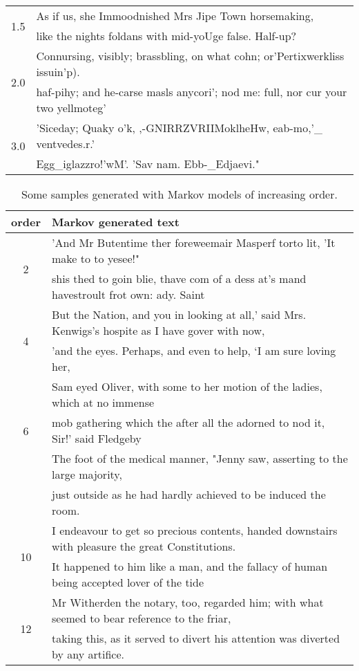 \documentclass[journal]{IEEEtran}
\begin{document}
\begin{table*}
\begin{center}
\begin{tabular}{|c|l|}
  \hline
  \multirow{2}{*}{1.5} & As if us, she Immoodnished Mrs Jipe Town horsemaking,\\
  & like the nights foldans with mid-yoUge false. Half-up?\\
  \hline
  \multirow{2}{*}{2.0} & Connursing, visibly; brassbling, on what cohn;
or’Pertixwerkliss issuin'p).\\
  & haf-pihy; and he-carse masls anycori’; nod me: full, nor cur your two
yellmoteg'\\
  \hline
  \multirow{2}{*}{3.0} & 'Siceday; Quaky o’k, ,-GNIRRZVRIIMoklheHw, eab-mo,'\_ ventvedes.r.'\\
  & Egg\_iglazzro!’wM’. 'Sav nam. Ebb-\_Edjaevi." \\
  \hline
  \end{tabular}
  \end{center}
\end{table*}

\begin{table*}
  \begin{center}
    \caption{Some samples generated with Markov models of increasing
order.\label{tab:text_markov}}
  \begin{tabular}{|c|l|}
  \hline
  order & Markov generated text \\
  \hline
  \multirow{2}{*}{2} & 'And Mr Butentime ther foreweemair Masperf torto lit, 'It
make to to yesee!" \\
  & shis thed to goin blie, thave com of a dess at's mand havestroult frot own:
ady. Saint\\
  \hline
  \multirow{2}{*}{4} & But the Nation, and you in looking at all,' said Mrs.
Kenwigs's hospite as I have gover with now,\\
  & 'and the eyes. Perhaps, and even to help, ‘I am sure loving her,\\
  \hline
  \multirow{3}{*}{6} & Sam eyed Oliver, with some to her motion of the ladies,
which at no immense\\
  & mob gathering which the after all the adorned to nod it, Sir!' said
Fledgeby\\
  \hline
  \multirow{2}{*}{8} & The foot of the medical manner, "Jenny saw, asserting to
the large majority,\\
  &just outside as he had hardly achieved to be induced the room.\\
  \hline
  \multirow{2}{*}{10} & I endeavour to get so precious contents, handed
downstairs with pleasure the great Constitutions. \\
  & It happened to him like a man,  and the fallacy of human being accepted
lover of the tide\\
  \hline
  \multirow{2}{*}{12} & Mr Witherden the notary, too, regarded him; with what
seemed to bear reference to the friar,\\
  & taking this, as it served to divert his attention was diverted by any
artifice.\\
  \hline
  \end{tabular}
  \end{center}
\end{table*}
\end{document}
